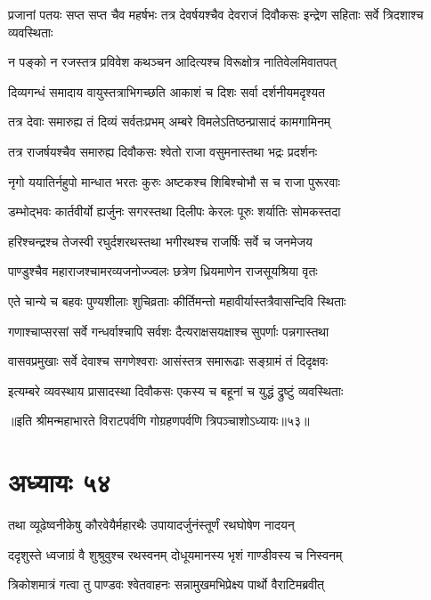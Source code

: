 \threelineshloka
{प्रजानां पतयः सप्त सप्त चैव महर्षभः}
{तत्र देवर्षयश्चैव देवराजं दिवौकसः}
{इन्द्रेण सहिताः सर्वे त्रिदशाश्च व्यवस्थिताः}


\twolineshloka
{न पङ्को न रजस्तत्र प्रविवेश कथञ्चन}
{आदित्यश्च विरूक्षोत्र नातिवेलमिवातपत्}


\twolineshloka
{दिव्यगन्धं समादाय वायुस्तत्राभिगच्छति}
{आकाशं च दिशः सर्वा दर्शनीयमदृश्यत}


\twolineshloka
{तत्र देवाः समारुह्य तं दिव्यं सर्वतःप्रभम्}
{अम्बरे विमलेऽतिष्ठन्प्रासादं कामगामिनम्}


\twolineshloka
{तत्र राजर्षयश्चैव समारुह्य दिवौकसः}
{श्वेतो राजा वसुमनास्तथा भद्रः प्रदर्शनः}


\twolineshloka
{नृगो ययातिर्नहुपो मान्धात भरतः कुरुः}
{अष्टकश्च शिबिश्चोभौ स च राजा पुरूरवाः}


\twolineshloka
{डम्भोद्भवः कार्तवीर्यो ह्यर्जुनः सगरस्तथा}
{दिलीपः केरलः पूरुः शर्यातिः सोमकस्तदा}


\twolineshloka
{हरिश्चन्द्रश्च तेजस्वी रघुर्दशरथस्तथा}
{भगीरथश्च राजर्षिः सर्वे च जनमेजय}


\twolineshloka
{पाण्डुश्चैव महाराजश्चामरव्यजनोज्ज्वलः}
{छत्रेण ध्रियमाणेन राजसूयश्रिया वृतः}


\twolineshloka
{एते चान्ये च बहवः पुण्यशीलाः शुचिव्रताः}
{कीर्तिमन्तो महावीर्यास्तत्रैवासन्दिवि स्थिताः}


\twolineshloka
{गणाश्चाप्सरसां सर्वे गन्धर्वाश्चापि सर्वशः}
{दैत्यराक्षसयक्षाश्च सुपर्णाः पन्नगास्तथा}


\twolineshloka
{वासवप्रमुखाः सर्वे देवाश्च सगणेश्वराः}
{आसंस्तत्र समारूढाः सङ्ग्रामं तं दिदृक्षवः}


\twolineshloka
{इत्यम्बरे व्यवस्थाय प्रासादस्था दिवौकसः}
{एकस्य च बहूनां च युद्धं द्रुष्टुं व्यवस्थिताः}

॥इति श्रीमन्महाभारते विराटपर्वणि गोग्रहणपर्वणि त्रिपञ्चाशोऽध्यायः॥५३॥

\chapter{अध्यायः ५४}

\twolineshloka
{तथा व्यूढेष्वनीकेषु कौरवेयैर्महारथैः}
{उपायादर्जुनंस्तूर्णं रथघोषेण नादयन्}


\twolineshloka
{ददृशुस्ते ध्वजाग्रं वै शुश्रुवुश्च रथस्वनम्}
{दोधूयमानस्य भृशं गाण्डीवस्य च निस्वनम्}


\twolineshloka
{त्रिकोशमात्रं गत्वा तु पाण्डवः श्वेतवाहनः}
{सन्नामुखमभिप्रेक्ष्य पार्थो वैराटिमब्रवीत्}


